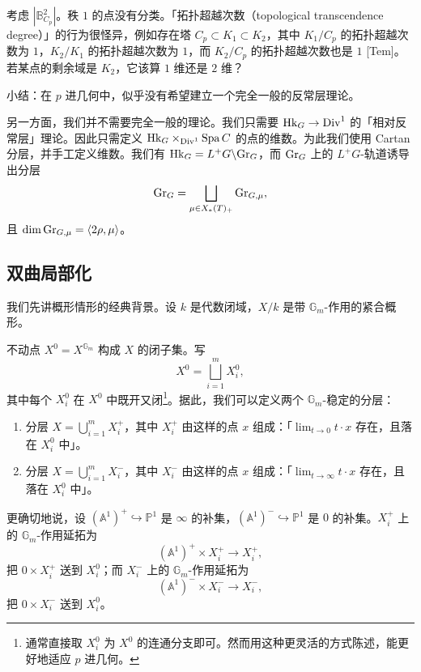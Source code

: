 \begin{example}
考虑 $|\mathbb{B}^2_{C_p}|$。秩 $1$ 的点没有分类。「拓扑超越次数（topological transcendence degree）」的行为很怪异，例如存在塔 $C_p\subset K_1\subset K_2$，其中 $K_1/C_p$ 的拓扑超越次数为 $1$，$K_2/K_1$ 的拓扑超越次数为 $1$，而 $K_2/C_p$ 的拓扑超越次数也是 $1$ [Tem]。若某点的剩余域是 $K_2$，它该算 $1$ 维还是 $2$ 维？
\end{example}

小结：在 $p$ 进几何中，似乎没有希望建立一个完全一般的反常层理论。

另一方面，我们并不需要完全一般的理论。我们只需要 $\mathrm{Hk}_G\to\mathrm{Div}^1$ 的「相对反常层」理论。因此只需定义 $\mathrm{Hk}_G\times_{\mathrm{Div}^1}\operatorname{Spa} C$ 的点的维数。为此我们使用 Cartan 分层，并手工定义维数。我们有 $\mathrm{Hk}_G=L^+G\backslash\mathrm{Gr}_G$，而 $\mathrm{Gr}_G$ 上的 $L^+G$-轨道诱导出分层
\[
\mathrm{Gr}_G=\bigsqcup_{\mu\in X_*(T)_+}\mathrm{Gr}_{G,\mu},
\]
且 $\dim\mathrm{Gr}_{G,\mu}=\langle2\rho,\mu\rangle$。

\subsection{双曲局部化}


我们先讲概形情形的经典背景。设 $k$ 是代数闭域，$X/k$ 是带 $\mathbb{G}_m$-作用的紧合概形。

不动点 $X^0=X^{\mathbb{G}_m}$ 构成 $X$ 的闭子集。写
\[
X^0=\bigsqcup_{i=1}^{m}X^0_i,
\]
其中每个 $X^0_i$ 在 $X^0$ 中既开又闭\footnote{通常直接取 $X^0_i$ 为 $X^0$ 的连通分支即可。然而用这种更灵活的方式陈述，能更好地适应 $p$ 进几何。}。据此，我们可以定义两个 $\mathbb{G}_m$-稳定的分层：
\begin{enumerate}[label=(\arabic*)]
\item 分层 $X=\bigcup_{i=1}^m X^+_i$，其中 $X^+_i$ 由这样的点 $x$ 组成：「$\lim_{t\to0}t\cdot x$ 存在，且落在 $X^0_i$ 中」。
\item 分层 $X=\bigcup_{i=1}^m X^-_i$，其中 $X^-_i$ 由这样的点 $x$ 组成：「$\lim_{t\to\infty}t\cdot x$ 存在，且落在 $X^0_i$ 中」。
\end{enumerate}

更确切地说，设 $(\mathbb{A}^1)^+\hookrightarrow\mathbb{P}^1$ 是 $\infty$ 的补集，$(\mathbb{A}^1)^-\hookrightarrow\mathbb{P}^1$ 是 $0$ 的补集。$X^+_i$ 上的 $\mathbb{G}_m$-作用延拓为
\[
(\mathbb{A}^1)^+\times X^+_i\to X^+_i,
\]
把 $0\times X^+_i$ 送到 $X^0_i$；而 $X^-_i$ 上的 $\mathbb{G}_m$-作用延拓为
\[
(\mathbb{A}^1)^-\times X^-_i\to X^-_i,
\]
把 $0\times X^-_i$ 送到 $X^0_i$。

